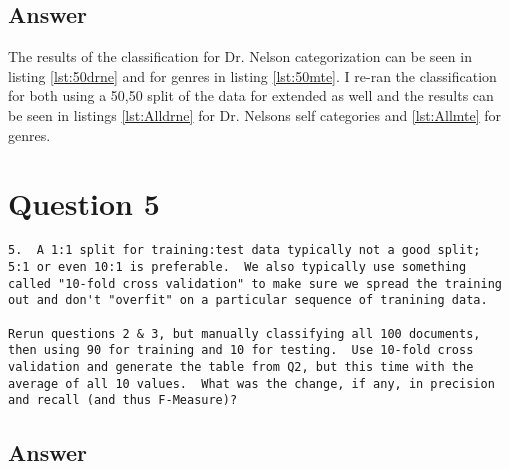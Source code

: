 \documentclass[letterpaper,10pt]{article}
\begin{document}
\subsection*{Answer}
The results of the classification for Dr. Nelson categorization can be seen in listing
\hyperref[lst:50drne]{\ref{lst:50drne}} and for genres in listing \hyperref[lst:50mte]{\ref{lst:50mte}}.
I re-ran the classification for both using a 50,50 split of the data for extended as well and the results can be seen in listings \hyperref[lst:Alldrne]{\ref{lst:Alldrne}} for Dr. Nelsons self categories and \hyperref[lst:Allmte]{\ref{lst:Allmte}} for genres.



  



 
\newpage
\section*{Question 5}
\begin{verbatim}
5.  A 1:1 split for training:test data typically not a good split;
5:1 or even 10:1 is preferable.  We also typically use something
called "10-fold cross validation" to make sure we spread the training
out and don't "overfit" on a particular sequence of tranining data.

Rerun questions 2 & 3, but manually classifying all 100 documents,
then using 90 for training and 10 for testing.  Use 10-fold cross
validation and generate the table from Q2, but this time with the
average of all 10 values.  What was the change, if any, in precision
and recall (and thus F-Measure)?
\end{verbatim}
\subsection*{Answer}
\end{document}

